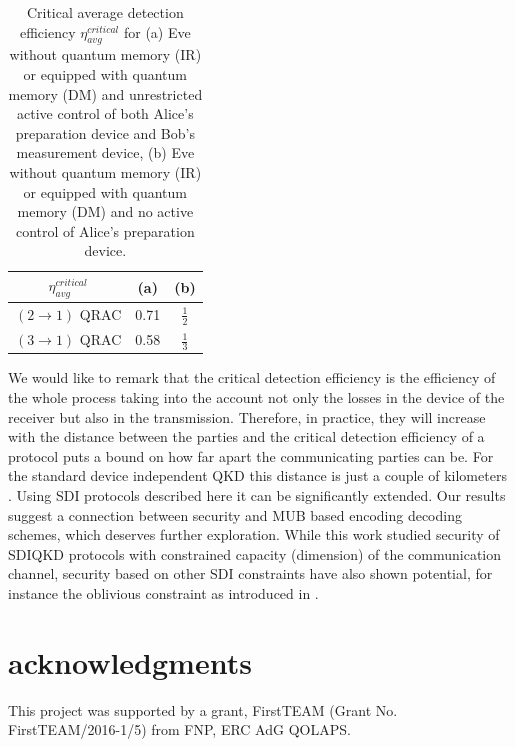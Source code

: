 \documentclass[smallextended]{svjour3}
\begin{document}
\begin{table}[]
\centering
\begin{tabular}{c|c|c}
$\eta_{avg}^{critical}$ & (a)  & (b)  
        \\ \hline
$(2\to1)$ QRAC          & 0.71 & $\frac{1}{2}$ \\ \hline
$(3\to1)$ QRAC          & 0.58 & $\frac{1}{3}$ 
\end{tabular}
\caption{Critical average detection efficiency $\eta_{avg}^{critical}$ for (a) Eve without quantum memory (IR) or equipped with quantum memory (DM) and unrestricted active control of both Alice's preparation device and Bob's measurement device, (b) Eve without quantum memory (IR) or equipped with quantum memory (DM) and no active control of Alice's preparation device. }
\label{Table1}
\end{table}

We would like to remark that the critical detection efficiency is the efficiency of the whole process taking into the account not only the losses in the device of the receiver but also in the transmission. Therefore, in practice, they will increase with the distance between the parties and the critical detection efficiency of a protocol puts a bound on how far apart the communicating parties can be. For the standard device independent QKD this distance is just a couple of kilometers \cite{dist}. Using SDI protocols described here it can be significantly extended. Our results suggest a connection between security and MUB based encoding decoding schemes, which deserves further exploration. While this work studied security of SDIQKD protocols with constrained capacity (dimension) of the communication channel, security based on other SDI constraints have also shown potential, for instance the oblivious constraint as introduced in \cite{OC}. 

\section{acknowledgments}


This project was supported by a grant, FirstTEAM
(Grant No. FirstTEAM/2016-1/5) from FNP, ERC
AdG QOLAPS. 
\end{document}

